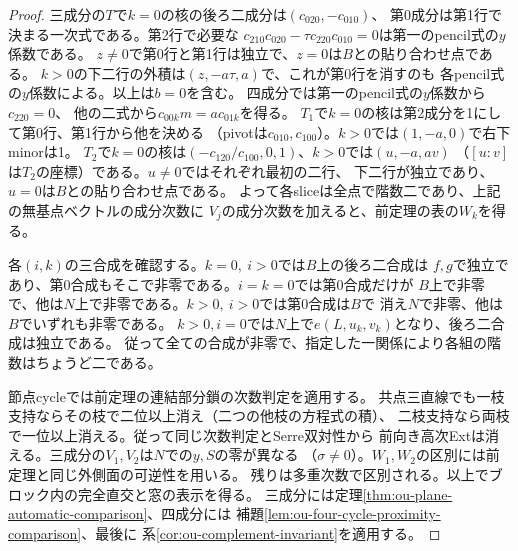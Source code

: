 \begin{proof}
三成分の$T$で$k=0$の核の後ろ二成分は$(c_{020},-c_{010})$、
第0成分は第1行で決まる一次式である。第2行で必要な
$c_{210}c_{020}-\tau c_{220}c_{010}=0$は第一のpencil式の$y$係数である。
$z\ne0$で第0行と第1行は独立で、$z=0$は$B$との貼り合わせ点である。
$k>0$の下二行の外積は$(z,-a\tau,a)$で、これが第0行を消すのも
各pencil式の$y$係数による。以上は$b=0$を含む。
四成分では第一のpencil式の$y$係数から$c_{220}=0$、
他の二式から$c_{00k}m=a c_{01k}$を得る。
$T_1$で$k=0$の核は第2成分を1にして第0行、第1行から他を決める
（pivotは$c_{010},c_{100}$）。$k>0$では$(1,-a,0)$で右下minorは1。
$T_2$で$k=0$の核は$(-c_{120}/c_{100},0,1)$、$k>0$では$(u,-a,av)$
（$[u:v]$は$T_2$の座標）である。$u\ne0$ではそれぞれ最初の二行、
下二行が独立であり、$u=0$は$B$との貼り合わせ点である。
よって各sliceは全点で階数二であり、上記の無基点ベクトルの成分次数に
$V_j$の成分次数を加えると、前定理の表の$W_k$を得る。

各$(i,k)$の三合成を確認する。$k=0,\ i>0$では$B$上の後ろ二合成は
$f,g$で独立であり、第0合成もそこで非零である。$i=k=0$では第0合成だけが
$B$上で非零で、他は$N$上で非零である。$k>0,\ i>0$では第0合成は$B$で
消え$N$で非零、他は$B$でいずれも非零である。
$k>0,i=0$では$N$上で$e(L,u_k,v_k)$となり、後ろ二合成は独立である。
従って全ての合成が非零で、指定した一関係により各組の階数はちょうど二である。

節点cycleでは前定理の連結部分鎖の次数判定を適用する。
共点三直線でも一枝支持ならその枝で二位以上消え（二つの他枝の方程式の積）、
二枝支持なら両枝で一位以上消える。従って同じ次数判定とSerre双対性から
前向き高次Extは消える。三成分の$V_1,V_2$は$N$での$y,S$の零が異なる
（$\sigma\ne0$）。$W_1,W_2$の区別には前定理と同じ外側面の可逆性を用いる。
残りは多重次数で区別される。以上でブロック内の完全直交と窓の表示を得る。
三成分には定理\ref{thm:ou-plane-automatic-comparison}、四成分には
補題\ref{lem:ou-four-cycle-proximity-comparison}、最後に
系\ref{cor:ou-complement-invariant}を適用する。
\end{proof}

